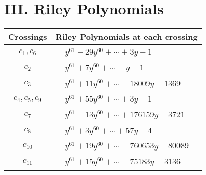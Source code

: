 \documentclass[1p]{elsarticle_modified}
\theoremstyle{definition}
\begin{document}
\centering \section*{ III. Riley Polynomials}
\begin{tabular}{m{50pt}|m{274pt}}
Crossings & \hspace{64pt}Riley Polynomials at each crossing \\
\hline $$\begin{aligned}c_{1},c_{6}\end{aligned}$$&$\begin{aligned}
&y^{61}-29 y^{60}+\cdots+3 y-1
\end{aligned}$\\
\hline $$\begin{aligned}c_{2}\end{aligned}$$&$\begin{aligned}
&y^{61}+7 y^{60}+\cdots- y-1
\end{aligned}$\\
\hline $$\begin{aligned}c_{3}\end{aligned}$$&$\begin{aligned}
&y^{61}+11 y^{60}+\cdots-18009 y-1369
\end{aligned}$\\
\hline $$\begin{aligned}c_{4},c_{5},c_{9}\end{aligned}$$&$\begin{aligned}
&y^{61}+55 y^{60}+\cdots+3 y-1
\end{aligned}$\\
\hline $$\begin{aligned}c_{7}\end{aligned}$$&$\begin{aligned}
&y^{61}-13 y^{60}+\cdots+176159 y-3721
\end{aligned}$\\
\hline $$\begin{aligned}c_{8}\end{aligned}$$&$\begin{aligned}
&y^{61}+3 y^{60}+\cdots+57 y-4
\end{aligned}$\\
\hline $$\begin{aligned}c_{10}\end{aligned}$$&$\begin{aligned}
&y^{61}+19 y^{60}+\cdots-760653 y-80089
\end{aligned}$\\
\hline $$\begin{aligned}c_{11}\end{aligned}$$&$\begin{aligned}
&y^{61}+15 y^{60}+\cdots-75183 y-3136
\end{aligned}$\\
\hline
\end{tabular}
\vskip 2pc
\end{document}
